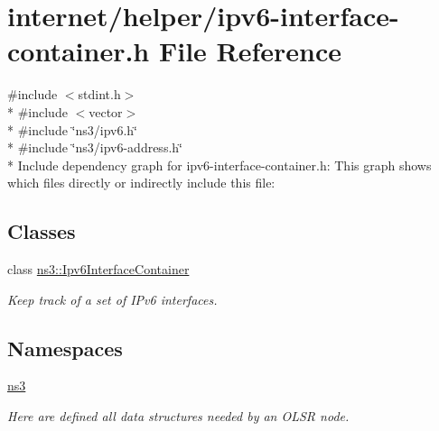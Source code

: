 \hypertarget{ipv6-interface-container_8h}{}\section{internet/helper/ipv6-\/interface-\/container.h File Reference}
\label{ipv6-interface-container_8h}
{\ttfamily \#include $<$stdint.\+h$>$}\\*
{\ttfamily \#include $<$vector$>$}\\*
{\ttfamily \#include \char`\"{}ns3/ipv6.\+h\char`\"{}}\\*
{\ttfamily \#include \char`\"{}ns3/ipv6-\/address.\+h\char`\"{}}\\*
Include dependency graph for ipv6-\/interface-\/container.h\+:
This graph shows which files directly or indirectly include this file\+:
\subsection*{Classes}
\begin{DoxyCompactItemize}
\item 
class \hyperlink{classns3_1_1Ipv6InterfaceContainer}{ns3\+::\+Ipv6\+Interface\+Container}
\begin{DoxyCompactList}\small\item\em Keep track of a set of I\+Pv6 interfaces. \end{DoxyCompactList}\end{DoxyCompactItemize}
\subsection*{Namespaces}
\begin{DoxyCompactItemize}
\item 
 \hyperlink{namespacens3}{ns3}
\begin{DoxyCompactList}\small\item\em Here are defined all data structures needed by an O\+L\+SR node. \end{DoxyCompactList}\end{DoxyCompactItemize}
